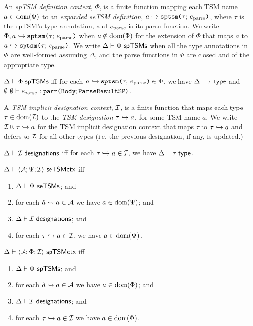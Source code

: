 An \emph{spTSM definition context}, $\Phi$, is a finite function mapping each TSM name $a \in \text{dom}(\Phi)$ to an \emph{expanded seTSM definition}, $a \hookrightarrow \texttt{sptsm}\texttt{(}\tau;\,e_\text{parse}\texttt{)}$, where $\tau$ is the spTSM's type annotation, and $e_\text{parse}$ is its parse function. We write $\Phi, a \hookrightarrow \texttt{sptsm}\texttt{(}\tau;\,e_\text{parse}\texttt{)}$ when $a \notin \text{dom}(\Phi)$ for the extension of $\Phi$ that maps $a$ to $a \hookrightarrow \texttt{sptsm}\texttt{(}\tau;\,e_\text{parse}\texttt{)}$. We write $\Delta \vdash \Phi~\mathsf{spTSMs}$  when all the type annotations in $\Phi$ are well-formed assuming $\Delta$, and the parse functions in $\Phi$ are closed and of the appropriate type.

\begin{definition}\label{def:spTSM-def-ctx-formation-B} $\Delta \vdash \Phi~\mathsf{spTSMs}$ iff for each $a \hookrightarrow \texttt{sptsm}\texttt{(}\tau;\,e_\text{parse}\texttt{)} \in \Phi$, we have $\Delta \vdash \tau~\mathsf{type}$ and $\emptyset~\emptyset \vdash e_\text{parse} : \texttt{parr}\texttt{(}\mathtt{Body}; \mathtt{ParseResultSP}\texttt{)}$.\end{definition}

A \emph{TSM implicit designation context}, $\mathcal{I}$, is a finite function that maps each type $\tau \in \text{dom}(\mathcal{I})$ to the \emph{TSM designation} $\tau \hookrightarrow a$, for some TSM name $a$. We write $\mathcal{I} \uplus \tau \hookrightarrow a$ for the TSM implicit designation context that maps $\tau$ to $\tau \hookrightarrow a$ and defers to $\mathcal{I}$ for all other types (i.e. the previous designation, if any, is updated.)

\begin{definition}\label{def:implicit-designation-ctx-formation-S} $\Delta \vdash \mathcal{I}~\mathsf{designations}$ iff for each $\tau \hookrightarrow a \in \mathcal{I}$, we have $\Delta \vdash \tau~\mathsf{type}$.
\end{definition}

\begin{definition} $\Delta \vdash \langle \mathcal{A}; \Psi; \mathcal{I} \rangle~\mathsf{seTSMctx}$ iff
\begin{enumerate}
\item $\Delta \vdash \Psi~\mathsf{seTSMs}$; and
\item for each $\hat{a} \leadsto a \in \mathcal{A}$ we have $a \in \text{dom}(\Psi)$; and
\item $\Delta \vdash \mathcal{I}~\mathsf{designations}$; and
\item for each $\tau \hookrightarrow a \in \mathcal{I}$, we have $a \in \text{dom}(\Psi)$.
\end{enumerate}
\end{definition}

\begin{definition} $\Delta \vdash \langle \mathcal{A}; \Phi; \mathcal{I} \rangle~\mathsf{spTSMctx}$ iff 
\begin{enumerate}
\item $\Delta \vdash \Phi~\mathsf{spTSMs}$; and
\item for each $\hat{a} \leadsto a \in \mathcal{A}$ we have $a \in \text{dom}(\Phi)$; and
\item $\Delta \vdash \mathcal{I}~\mathsf{designations}$; and
\item for each $\tau \hookrightarrow a \in \mathcal{I}$ we have $a \in \text{dom}(\Phi)$.
\end{enumerate}
\end{definition}

